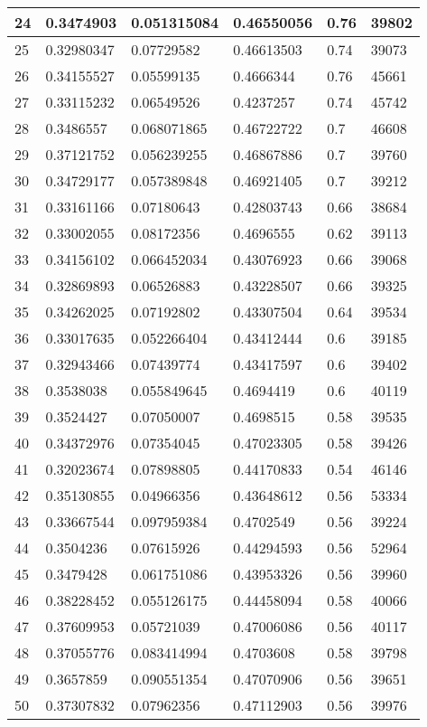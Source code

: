 \begin{longtable}{|l|l|l|l|l|l|}
24 & 0.3474903 & 0.051315084 & 0.46550056 & 0.76 & 39802 \\ \hline 
25 & 0.32980347 & 0.07729582 & 0.46613503 & 0.74 & 39073 \\ \hline 
26 & 0.34155527 & 0.05599135 & 0.4666344 & 0.76 & 45661 \\ \hline 
27 & 0.33115232 & 0.06549526 & 0.4237257 & 0.74 & 45742 \\ \hline 
28 & 0.3486557 & 0.068071865 & 0.46722722 & 0.7 & 46608 \\ \hline 
29 & 0.37121752 & 0.056239255 & 0.46867886 & 0.7 & 39760 \\ \hline 
30 & 0.34729177 & 0.057389848 & 0.46921405 & 0.7 & 39212 \\ \hline 
31 & 0.33161166 & 0.07180643 & 0.42803743 & 0.66 & 38684 \\ \hline 
32 & 0.33002055 & 0.08172356 & 0.4696555 & 0.62 & 39113 \\ \hline 
33 & 0.34156102 & 0.066452034 & 0.43076923 & 0.66 & 39068 \\ \hline 
34 & 0.32869893 & 0.06526883 & 0.43228507 & 0.66 & 39325 \\ \hline 
35 & 0.34262025 & 0.07192802 & 0.43307504 & 0.64 & 39534 \\ \hline 
36 & 0.33017635 & 0.052266404 & 0.43412444 & 0.6 & 39185 \\ \hline 
37 & 0.32943466 & 0.07439774 & 0.43417597 & 0.6 & 39402 \\ \hline 
38 & 0.3538038 & 0.055849645 & 0.4694419 & 0.6 & 40119 \\ \hline 
39 & 0.3524427 & 0.07050007 & 0.4698515 & 0.58 & 39535 \\ \hline 
40 & 0.34372976 & 0.07354045 & 0.47023305 & 0.58 & 39426 \\ \hline 
41 & 0.32023674 & 0.07898805 & 0.44170833 & 0.54 & 46146 \\ \hline 
42 & 0.35130855 & 0.04966356 & 0.43648612 & 0.56 & 53334 \\ \hline 
43 & 0.33667544 & 0.097959384 & 0.4702549 & 0.56 & 39224 \\ \hline 
44 & 0.3504236 & 0.07615926 & 0.44294593 & 0.56 & 52964 \\ \hline 
45 & 0.3479428 & 0.061751086 & 0.43953326 & 0.56 & 39960 \\ \hline 
46 & 0.38228452 & 0.055126175 & 0.44458094 & 0.58 & 40066 \\ \hline 
47 & 0.37609953 & 0.05721039 & 0.47006086 & 0.56 & 40117 \\ \hline 
48 & 0.37055776 & 0.083414994 & 0.4703608 & 0.58 & 39798 \\ \hline 
49 & 0.3657859 & 0.090551354 & 0.47070906 & 0.56 & 39651 \\ \hline 
50 & 0.37307832 & 0.07962356 & 0.47112903 & 0.56 & 39976 \\ \hline 
\end{longtable}